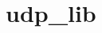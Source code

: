 \chapter{udp\+\_\+lib }
\hypertarget{md_README}{}\label{md_README}
\label{md_README_autotoc_md0}%
%
